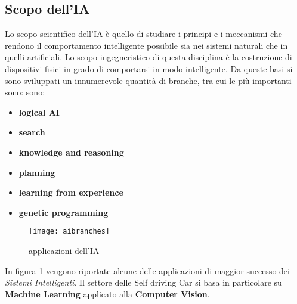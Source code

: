 \subsection{Scopo dell'IA}
Lo scopo scientifico  dell'IA è quello di studiare i principi e i meccanismi che rendono il comportamento intelligente possibile sia
nei sistemi naturali che in quelli artificiali. Lo scopo ingegneristico di questa disciplina è la costruzione di dispositivi fisici
in grado di comportarsi in modo intelligente. Da queste basi si sono sviluppati un innumerevole quantità di branche, tra cui le più importanti sono:
sono:\cite{ai}
\begin{itemize}
  \item \textbf{logical AI}
  \item \textbf{search}
  \item \textbf{knowledge and reasoning}
  \item \textbf{planning}
  \item \textbf{learning from experience}
  \item \textbf{genetic programming}
\end{itemize}
\begin{figure}
  \texttt{[image: aibranches]}
  \caption{applicazioni dell'IA\cite{branch}}
  \label{fig:branches}
\end{figure}
In figura \ref{fig:branches} vengono riportate alcune delle applicazioni di maggior successo dei \emph{Sistemi Intelligenti}.
Il settore delle Self driving Car si basa in particolare su \textbf{Machine Learning} applicato alla \textbf{Computer Vision}.
